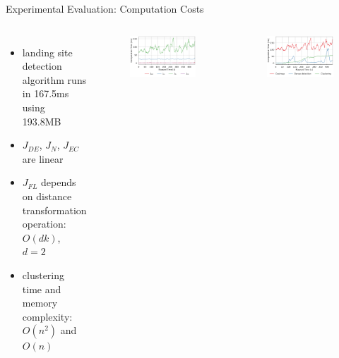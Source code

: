\documentclass[10pt]{beamer}
\begin{document}
    \begin{frame}{Experimental Evaluation: Computation Costs}
        \begin{columns}[c,onlytextwidth]
                \begin{itemize}
                    \item landing site detection algorithm runs in 167.5ms
                        using 193.8MB
                    \item $J_{DE}$, $J_N$, $J_{EC}$ are linear
                    \item $J_{FL}$ depends on distance transformation
                        operation: $O(dk)$, $d=2$
                    \item clustering time and memory complexity:
                        $O(n^2)$ and $O(n)$
                \end{itemize}

                \vspace{0.4cm}
                \begin{figure}
                    \centering
                    \includegraphics[width=\textwidth]{images/Fig8a.png}
                \end{figure}
                \vspace{-0.8cm}
                \begin{figure}
                    \centering
                    \includegraphics[width=\textwidth]{images/Fig8b.png}
                \end{figure}
        \end{columns}
    \end{frame}
\end{document}
